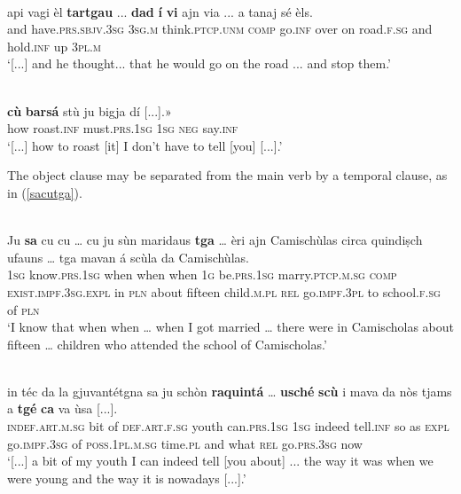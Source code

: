 \ea
\label{}
\\
\gll  [...] api vagi èl \textbf{tartgau} ... \textbf{dad} \textbf{í} \textbf{vi} ajn via ... a tanaj sé èls.  \\
{} and have.\textsc{prs.sbjv.3sg} \textsc{3sg.m} think.\textsc{ptcp.unm} {} \textsc{comp} go.\textsc{inf} over on road.\textsc{f.sg} {} and hold.\textsc{inf} up \textsc{3pl.m}\\
\glt `[...] and he thought... that he would go on the road ... and stop them.'
\z

\ea
\label{}
\\
\gll [...] \textbf{cù} \textbf{barsá} stù ju bigja dí [...].»\\
{} how roast.\textsc{inf} must.\textsc{prs.1sg} \textsc{1sg} \textsc{neg} say.\textsc{inf}\\
\glt `[...] how to roast [it] I don't have to tell [you] [...].'
\z


The object clause may be separated from the main verb by a temporal clause, as in (\ref{sacutga}).

\ea
\label{sacutga}
\\
\gll    Ju \textbf{sa} cu cu … cu ju sùn maridaus \textbf{tga} … èri ajn Camischùlas circa quindiṣch ufauns … tga mavan á scùla da Camischùlas.\\
\textsc{1sg} know.\textsc{prs.1sg} when when {} when \textsc{1g} be.\textsc{prs.1sg}  marry.\textsc{ptcp.m.sg} \textsc{comp} {} \textsc{exist.impf.3sg.expl} in \textsc{pln} about fifteen child.\textsc{m.pl} {} \textsc{rel} go.\textsc{impf.3pl} to school.\textsc{f.sg} of  \textsc{pln}\\
\glt `I know that when when … when I got married … there were in Camischolas about fifteen … children who attended the school of Camischolas.'
\z

\ea
\label{}
\\
	\gll [...] in téc da la gjuvantétgna sa ju schòn \textbf{raquintá} … \textbf{usché} \textbf{scù} i mava da nòs tjams a \textbf{tgé} \textbf{ca} va ùsa [...].\\
{} \textsc{indef.art.m.sg} bit of \textsc{def.art.f.sg} youth can.\textsc{prs.1sg} \textsc{1sg} indeed tell.\textsc{inf} {} so as \textsc{expl} go.\textsc{impf.3sg} of \textsc{poss.1pl.m.sg} time.\textsc{pl} and what \textsc{rel} go.\textsc{prs.3sg} now \\
\glt `[...] a bit of my youth I can indeed tell [you about] ... the way it was when we were young and the way it is nowadays [...].'
\z

